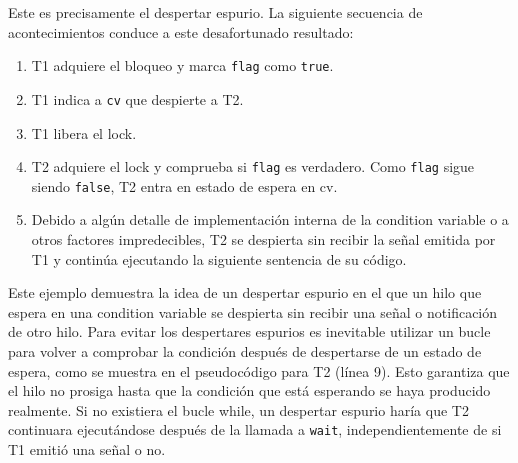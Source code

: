 Este es precisamente el despertar espurio. La siguiente secuencia de acontecimientos conduce a
este desafortunado resultado:

\begin{enumerate}
      \item T1 adquiere el bloqueo y marca \texttt{flag} como \texttt{true}.
      \item T1 indica a \texttt{cv} que despierte a T2.
      \item T1 libera el lock.
      \item T2 adquiere el lock y comprueba si \texttt{flag} es verdadero. Como \texttt{flag} sigue siendo
            \texttt{false}, T2 entra en estado de espera en cv.
      \item Debido a algún detalle de implementación interna de la condition variable o a otros
            factores impredecibles, T2 se despierta sin recibir la señal emitida por T1 y continúa
            ejecutando la siguiente sentencia de su código.
\end{enumerate}

Este ejemplo demuestra la idea de un despertar espurio en el que un hilo que espera en una
condition variable se despierta sin recibir una señal o notificación de otro hilo. Para evitar
los despertares espurios es inevitable utilizar un bucle para volver a comprobar la condición
después de despertarse de un estado de espera, como se muestra en el pseudocódigo para T2
(línea 9). Esto garantiza que el hilo no prosiga hasta que la condición que está esperando se
haya producido realmente. Si no existiera el bucle while, un despertar espurio haría que T2
continuara ejecutándose después de la llamada a \texttt{wait}, independientemente de si T1 emitió
una señal o no.